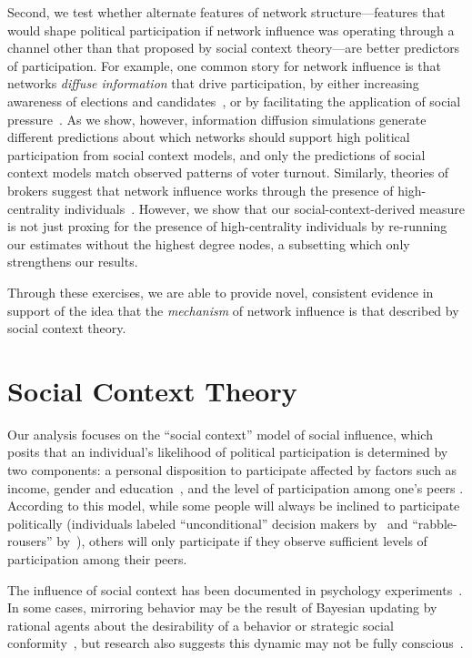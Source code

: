 \documentclass[12pt]{article}
\begin{document}
Second, we test whether alternate features of network structure---features that would shape political participation if network influence was operating through a channel other than that proposed by social context theory---are better predictors of participation. For example, one common story for network influence is that networks \emph{diffuse information} that drive participation, by either increasing awareness of elections and candidates~\citep{mcclurg2003social}, or by facilitating the application of social pressure~\citep{EubankKronick, larson2017west}. As we show, however, information diffusion simulations generate different predictions about which networks should support high political participation from social context models, and only the predictions of social context models match observed patterns of voter turnout. Similarly, theories of brokers suggest that network influence works through the presence of high-centrality individuals~\citep{Rojo:2014vw}. However, we show that our social-context-derived measure is not just proxing for the presence of high-centrality individuals by re-running our estimates without the highest degree nodes, a subsetting which only strengthens our results.

Through these exercises, we are able to provide novel, consistent evidence in support of the idea that the \emph{mechanism} of network influence is that described by social context theory.

\section{Social Context Theory}


Our analysis focuses on the ``social context'' model of social influence, which posits that an individual's likelihood of political participation is determined by two components: a personal disposition to participate affected by factors such as income, gender and education~\citep{wolfinger1980votes}, and the level of participation among one's peers \citep{Fowler:2005ts,Siegel:2009vi,Rolfe:2012ka}. According to this model, while some people will always be inclined to participate politically (individuals labeled ``unconditional'' decision makers by~\citet{Rolfe:2012ka} and ``rabble-rousers'' by~\citet{Siegel:2009vi}), others will only participate if they observe sufficient levels of participation among their peers.

The influence of social context has been documented in psychology experiments~\citep{ross2011person}.  In some cases, mirroring behavior may be the result of Bayesian updating by rational agents about the desirability of a behavior or strategic social conformity~\citep{goyal2012connections}, but research also suggests this dynamic may not be fully conscious~\citep{Cialdini:2015gt}.
\end{document}
